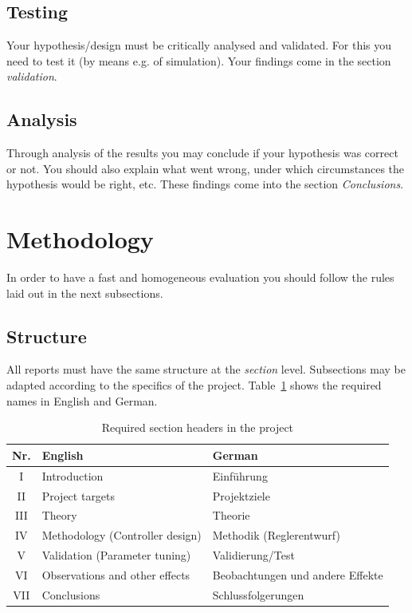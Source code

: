 	\subsection{Testing}
	
	Your hypothesis/design must be critically analysed and validated. For this you need to test it (by means e.g. of simulation). Your findings come in the section \emph{validation}.
	
	\subsection{Analysis}
	
	Through analysis of the results you may conclude if your hypothesis was correct or not. You should also explain what went wrong, under which circumstances the hypothesis would be right, etc. These findings come into the section \emph{Conclusions}.
	
	\section{Methodology} 
	
	In order to have a fast and homogeneous evaluation you should follow the rules laid out in the next subsections.
	
	\subsection{Structure}
	
	All reports must have the same structure at the \emph{section} level. Subsections may be adapted according to the specifics of the project. Table~\ref{tbl:sections} shows the required names in English and German.
	
	\begin{table}[hb]
		\caption{Required section headers in the project}\label{tbl:sections}
		\centering
		\begin{tabular}{cp{12em}p{12em}}
			\hline
			\bfseries Nr. & \bfseries English & \bfseries German\\
			\hline
			I & Introduction & Einführung\\
			II & Project targets & Projektziele \\
			III & Theory & Theorie \\
			IV & Methodology (Controller design) & Methodik (Reglerentwurf)\\
			V & Validation (Parameter tuning) & Validierung/Test \\
			VI & Observations and other effects & Beobachtungen und andere Effekte\\
			VII & Conclusions & Schlussfolgerungen\\
			\hline
		\end{tabular}
	\end{table}
	


